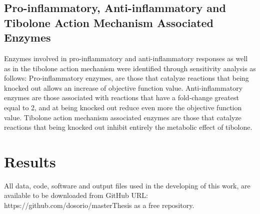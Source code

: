 \subsection*{Pro-inflammatory, Anti-inflammatory and Tibolone Action Mechanism Associated Enzymes}
Enzymes involved in pro-inflammatory and anti-inflammatory responses as well as in the tibolone action mechanism were identified through sensitivity analysis as follows: Pro-inflammatory enzymes, are those that catalyze reactions that being knocked out allows an increase of objective function value. Anti-inflammatory enzymes are those associated with reactions that have a fold-change greatest equal to 2, and at being knocked out reduce even more the objective function value. Tibolone action mechanism associated enzymes are those that catalyze reactions that being knocked out inhibit entirely the metabolic effect of tibolone.

\section{Results}
All data, code, software and output files used in the developing of this work, are available to be downloaded from GitHub URL: https://github.com/dosorio/masterThesis as a free repository.

